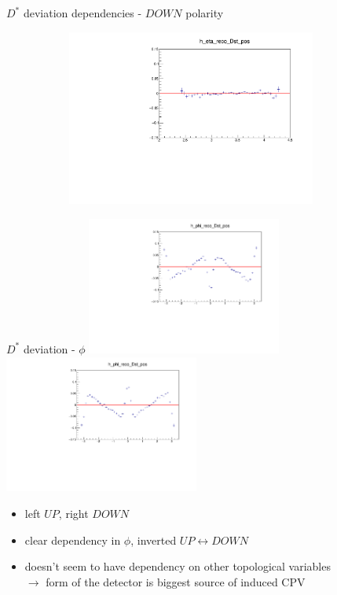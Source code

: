 \documentclass[11pt]{beamer}
\begin{document}
\begin{frame}{$D^*$ deviation dependencies - $DOWN$ polarity}
\begin{figure}
\begin{subfigure}{0.45\textwidth}
\end{subfigure}
\begin{subfigure}{0.45\textwidth}
\includegraphics[width=0.9\textwidth]{down_pdf/deviation/h_eta_reco_Dst_pos_dev.pdf}
\end{subfigure}
\end{figure}
\end{frame}
\begin{frame}{$D^*$ deviation - $\phi$}
\centering
\includegraphics[width=0.48\textwidth]{up_pdf/deviation/h_phi_reco_Dst_pos_dev.pdf}
\includegraphics[width=0.48\textwidth]{down_pdf/deviation/h_phi_reco_Dst_pos_dev.pdf}
\begin{itemize}
\item left $UP$, right $DOWN$
\item clear dependency in $\phi$, inverted $UP\leftrightarrow DOWN$
\item doesn't seem to have dependency on other topological variables\\
$\rightarrow$ form of the detector is biggest source of induced CPV
\end{itemize}
\end{frame}
\end{document}
